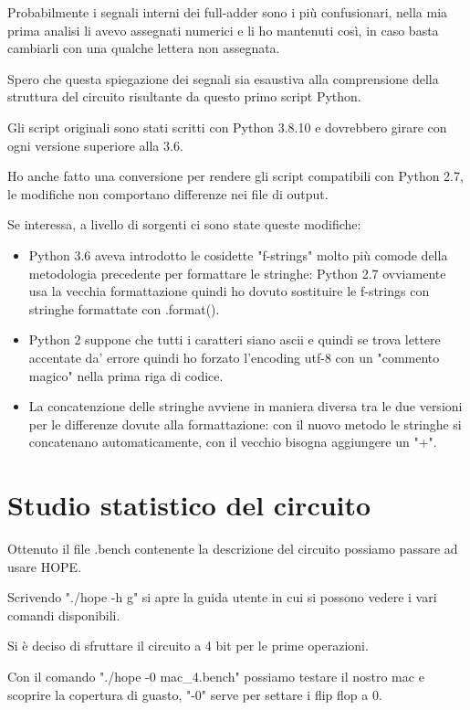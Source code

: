 \documentclass[12pt, letterpaper]{article}
\begin{document}
Probabilmente i segnali interni dei full-adder sono i più confusionari, nella mia prima analisi li avevo assegnati numerici e li ho mantenuti così, in caso basta cambiarli con una qualche lettera non assegnata.

Spero che questa spiegazione dei segnali sia esaustiva alla comprensione della struttura del circuito risultante da questo primo script Python.

Gli script originali sono stati scritti con Python 3.8.10 e dovrebbero girare con ogni versione superiore alla 3.6.

Ho anche fatto una conversione per rendere gli script compatibili con Python 2.7, le modifiche non comportano differenze nei file di output.

Se interessa, a livello di sorgenti ci sono state queste modifiche:
\begin{itemize}
\item Python 3.6 aveva introdotto le cosidette "f-strings" molto più comode della metodologia precedente per formattare le stringhe: Python 2.7 ovviamente usa la vecchia formattazione quindi ho dovuto sostituire le f-strings con stringhe formattate con .format().
\item Python 2 suppone che tutti i caratteri siano ascii e quindi se trova lettere accentate da' errore quindi ho forzato l'encoding utf-8 con un "commento magico" nella prima riga di codice.
\item La concatenzione delle stringhe avviene in maniera diversa tra le due versioni per le differenze dovute alla formattazione: con il nuovo metodo le stringhe si concatenano automaticamente, con il vecchio bisogna aggiungere un "+".
\end{itemize}

\section{Studio statistico del circuito}

Ottenuto il file .bench contenente la descrizione del circuito possiamo passare ad usare HOPE.

Scrivendo "./hope -h g" si apre la guida utente in cui si possono vedere i vari comandi disponibili.

Si è deciso di sfruttare il circuito a 4 bit per le prime operazioni.

Con il comando "./hope -0 mac\_4.bench" possiamo testare il nostro mac e scoprire la copertura di guasto, "-0" serve per settare i flip flop a 0.
\end{document}
